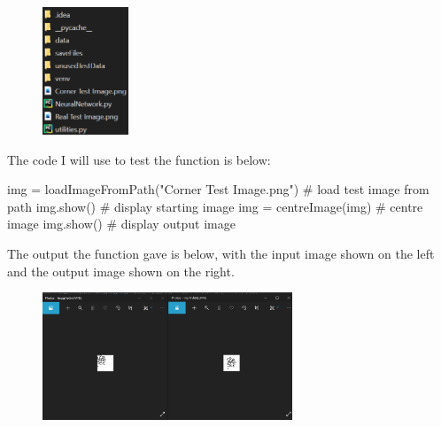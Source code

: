 \documentclass{report}
\begin{document}
\begin{figure}[H]
    \centering
    \includegraphics[height = 1.5in]{Images/Development and Testing/Stage 4/Centre Image/Location in File System.png}
    \label{fig:input images}
\end{figure}
\noindent The code I will use to test the function is below:
\begin{python}
img = loadImageFromPath("Corner Test Image.png")  # load test image from path
img.show()  # display starting image
img = centreImage(img)  # centre image
img.show()  # display output image
\end{python}
The output the function gave is below, with the input image shown on the left and the output image shown  on the right.
\begin{figure}[H]
    \centering
    \includegraphics[height=1.5in]{Images/Development and Testing/Stage 4/Centre Image/Corner Test Image - Test.png}
    \label{fig:Test-Corner Case}
\end{figure}
\end{document}
